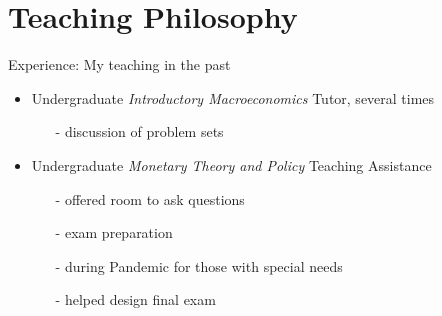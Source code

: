 

\section{Teaching Philosophy}


\begin{frame}{Experience: My teaching in the past}
	\begin{itemize}
		\item Undergraduate \textit{Introductory  Macroeconomics} Tutor, several times
		\vspace{2mm}
		\begin{itemize}
			\item[-] discussion of problem sets
		\end{itemize}
	\vspace{3mm}
		\item Undergraduate \textit{Monetary Theory and Policy} Teaching Assistance
		\vspace{2mm}		
		\begin{itemize}
			\item[-] offered room to ask questions
			\item[-] exam preparation 
			\item[-] during Pandemic for those with special needs
			\item[-] helped design final exam
		\end{itemize}
	\end{itemize}
\end{frame}

